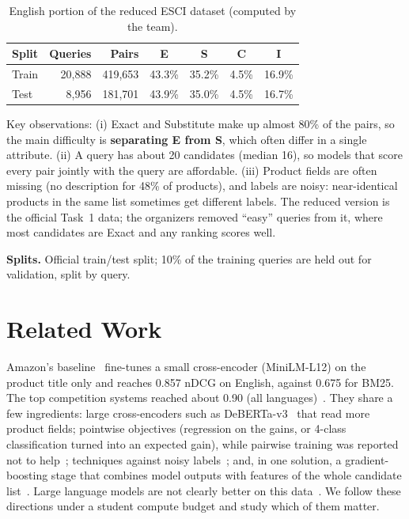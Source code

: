 \documentclass[11pt,a4paper]{article}
\begin{document}
\begin{table}[H]
\centering
\caption{English portion of the reduced ESCI dataset (computed by the team).}
\label{tab:data}
\small
\begin{tabular}{@{}lrrcccc@{}}
\toprule
\textbf{Split} & \textbf{Queries} & \textbf{Pairs} & \textbf{E} & \textbf{S} & \textbf{C} & \textbf{I} \\
\midrule
Train & 20{,}888 & 419{,}653 & 43.3\% & 35.2\% & 4.5\% & 16.9\% \\
Test  & 8{,}956  & 181{,}701 & 43.9\% & 35.0\% & 4.5\% & 16.7\% \\
\bottomrule
\end{tabular}
\end{table}

\noindent Key observations:
(i) Exact and Substitute make up almost 80\% of the pairs, so the main difficulty is \textbf{separating E from S}, which often differ in a single attribute.
(ii) A query has about 20 candidates (median 16), so models that score every pair jointly with the query are affordable.
(iii) Product fields are often missing (no description for 48\% of products), and labels are noisy: near-identical products in the same list sometimes get different labels.
The reduced version is the official Task~1 data; the organizers removed ``easy'' queries from it, where most candidates are Exact and any ranking scores well.

\noindent\textbf{Splits.} Official train/test split; 10\% of the training queries are held out for validation, split by query.

\section{Related Work}
Amazon's baseline~\cite{esci} fine-tunes a small cross-encoder (MiniLM-L12) on the product title only and reaches 0.857 nDCG on English, against 0.675 for BM25. The top competition systems reached about 0.90 (all languages)~\cite{top1,second,zhichun,practice}. They share a few ingredients: large cross-encoders such as DeBERTa-v3~\cite{deberta} that read more product fields; pointwise objectives (regression on the gains, or 4-class classification turned into an expected gain), while pairwise training was reported not to help~\cite{second}; techniques against noisy labels~\cite{top1,zhichun}; and, in one solution, a gradient-boosting stage that combines model outputs with features of the whole candidate list~\cite{practice}. Large language models are not clearly better on this data~\cite{ebay}. We follow these directions under a student compute budget and study which of them matter.
\end{document}
